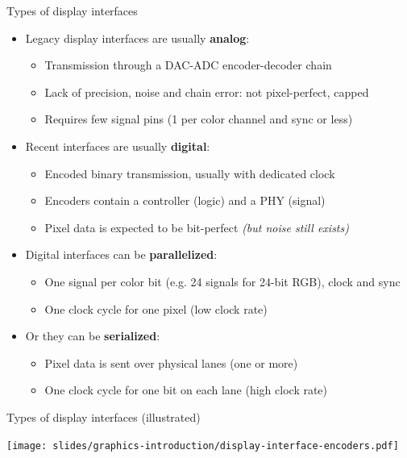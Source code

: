 \begin{frame}{Types of display interfaces}
  \begin{itemize}
  \item Legacy display interfaces are usually \textbf{analog}:
  \begin{itemize}
    \item Transmission through a DAC-ADC encoder-decoder chain
    \item Lack of precision, noise and chain error: not pixel-perfect, capped
    \item Requires few signal pins (1 per color channel and sync or less)
  \end{itemize}
  \item Recent interfaces are usually \textbf{digital}:
    \begin{itemize}
    \item Encoded binary transmission, usually with dedicated clock
    \item Encoders contain a controller (logic) and a PHY (signal)
    \item Pixel data is expected to be bit-perfect \textit{(but noise still exists)}
    \end{itemize}
  \item Digital interfaces can be \textbf{parallelized}:
    \begin{itemize}
    \item One signal per color bit (e.g. 24 signals for 24-bit RGB), clock and sync
    \item One clock cycle for one pixel (low clock rate)
    \end{itemize}
  \item Or they can be \textbf{serialized}:
    \begin{itemize}
    \item Pixel data is sent over physical lanes (one or more)
    \item One clock cycle for one bit on each lane (high clock rate)
    \end{itemize}
  \end{itemize}
\end{frame}

\begin{frame}{Types of display interfaces (illustrated)}
  \begin{center}
    \texttt{[image: slides/graphics-introduction/display-interface-encoders.pdf]}
  \end{center}
\end{frame}

